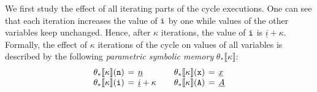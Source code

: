 \documentclass{sig-alternate}%
\newcommand{\var}[1]{{\tt #1}}
\newcommand{\sym}[1]{\ensuremath{\underline{#1}}}
\newcommand{\prm}[1]{\ensuremath{\llbracket #1 \rrbracket}}
\begin{document}
We first study the effect of all iterating parts of the cycle
executions. One can see that each iteration increases the value of $\var{i}$
by one while values of the other variables keep unchanged. Hence, after
$\kappa$ iterations, the value of $\var{i}$ is $\sym{i}+\kappa$. Formally,
the effect of $\kappa$ iterations of the cycle on values of all variables is
described by the following \emph{parametric symbolic memory}
$\theta_*\prm{\kappa}$:
\[
\setlength{\arraycolsep}{2pt}
\begin{array}{rclp{3ex}rcl}
  \theta_*\prm{\kappa}(\var{n})&=&\sym{n}&&
  \theta_*\prm{\kappa}(\var{x})&=&\sym{x}\\
  \theta_*\prm{\kappa}(\var{i})&=&\sym{i}+\kappa&&
  \theta_*\prm{\kappa}(\var{A})&=&\sym{A}\\
\end{array}
\]
\end{document}
